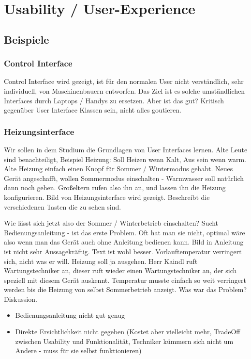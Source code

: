 \section{Usability / User-Experience}

\subsection{Beispiele}
\subsubsection{Control Interface}
Control Interface wird gezeigt, ist für den normalen User nicht verständlich,
sehr individuell, von Maschinenbauern entworfen. 
Das Ziel ist es solche umständlichen Interfaces durch Laptops / Handys zu ersetzen. 
Aber ist das gut? Kritisch gegenüber User Interface Klassen sein, nicht alles goutieren.

\subsubsection{Heizungsinterface}
Wir sollen in dem Studium die Grundlagen von User Interfaces lernen. 
Alte Leute sind benachteiligt, Beispiel Heizung: Soll Heizen wenn Kalt, Aus sein wenn warm.
Alte Heizung einfach einen Knopf für Sommer / Wintermodus gehabt. Neues Gerät angeschafft, wollen Sommermodus einschalten - Warmwasser soll natürlich dann noch gehen.
Großeltern rufen also ihn an, und lassen ihn die Heizung konfigurieren. 
Bild von Heizungsinterface wird gezeigt. Beschreibt die verschiedenen Tasten die zu sehen sind. 

Wie lässt sich jetzt also der Sommer / Winterbetrieb einschalten? Sucht
Bedienungsanleitung - ist das erste Problem. Oft hat man sie nicht, optimal wäre
also wenn man das Gerät auch ohne Anleitung bedienen kann. 
Bild in Anleitung ist nicht sehr Aussagekräftig. Text ist wohl besser. 
Vorlauftemperatur verringert sich, nicht was er will. Heizung soll ja ausgehen.
Herr Kaindl ruft Wartungstechniker an, dieser ruft wieder einen Wartungstechniker an,
der sich speziell mit diesem Gerät auskennt. 
Temperatur musste einfach so weit verringert werden bis die Heizung von selbst
Sommerbetrieb anzeigt. 
Was war das Problem? Diskussion.
\begin{itemize}
\item Bedienungsanleitung nicht gut genug
\item Direkte Ersichtlichkeit nicht gegeben (Kostet aber vielleicht mehr, TradeOff
zwischen Usability und Funktionalität, Techniker kümmern sich nicht um Andere - 
muss für sie selbst funktionieren)
\end{itemize}


